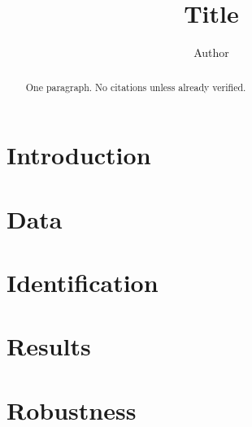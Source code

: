 \documentclass[12pt]{article}
\title{Title}
\author{Author}
\date{}
\begin{document}
\maketitle

\begin{abstract}
One paragraph. No citations unless already verified.
\end{abstract}

\section{Introduction}

\section{Data}

\section{Identification}

\section{Results}

\section{Robustness}
\end{document}
